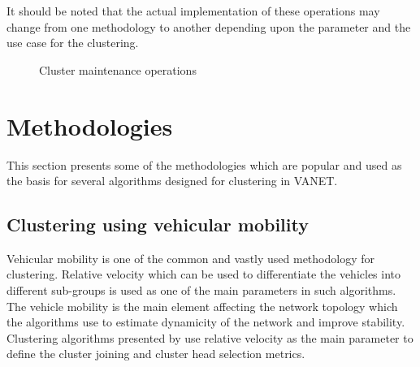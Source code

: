 \documentclass[]{ccs-thesis}
\begin{document}
It should be noted that the actual implementation of these operations may change from one methodology to another depending upon the parameter and the
use case for the clustering.

\begin{figure}
    \centering
    \vfill%

    \caption{Cluster maintenance operations}
    \label{fig:maintenance}
\end{figure}

\section{Methodologies}

This section presents some of the methodologies which are popular and used as the basis for several algorithms designed for clustering
in \ac{VANET}.

\subsection{Clustering using vehicular mobility}

Vehicular mobility is one of the common and vastly used methodology for clustering. Relative velocity which can be used to differentiate
the vehicles into different sub-groups is used as one of the main parameters in such algorithms. The vehicle mobility is the main element
affecting the network topology which the algorithms use to estimate dynamicity of the network and improve stability. Clustering algorithms
presented by \textcite{ARKIAN2014197, 6737622, 6077004} use relative velocity as the main parameter to define the cluster joining and cluster
head selection metrics.
\end{document}
